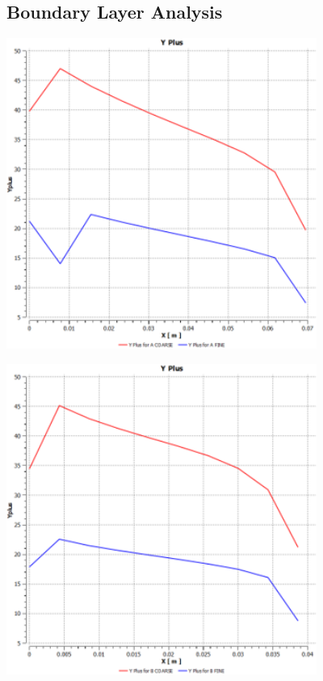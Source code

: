 \documentclass[12pt]{article} %
\begin{document}
\subsection{Boundary Layer Analysis}
\begin{center}
    \includegraphics[width=4in]{YPlus_A.png}
    \label{fig:YPlusA}
\end{center}

\begin{center}
    \includegraphics[width=4in]{YPlus_B.png}
    \label{fig:YPlusB}
\end{center}
\end{document}
